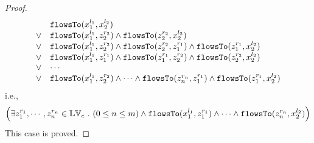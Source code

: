 \begin{proof}
\[\begin{array}{ll}
      & \mathtt{flowsTo}(x_1^{l_1}, x_2^{l_2}) \\
  \lor  & \mathtt{flowsTo}(x_1^{l_1}, z_2^{r_2}) \land \mathtt{flowsTo}(z_2^{r_2}, x_2^{l_2})\\
  \lor  & \mathtt{flowsTo}(x_1^{l_1}, z_2^{r_2}) \land \mathtt{flowsTo}(z_2^{r_2}, z_1^{r_1}) \land \mathtt{flowsTo}(z_1^{r_1}, x_2^{l_2}) \\
  \lor  & \mathtt{flowsTo}(x_1^{l_1}, z_1^{r_1}) \land \mathtt{flowsTo}(z_1^{r_1}, z_2^{r_2}) \land \mathtt{flowsTo}(z_2^{r_2}, x_2^{l_2}) \\
  \lor  & \cdots \\
  \lor  & \mathtt{flowsTo}(x_1^{l_1}, z_2^{r_2}) \land \cdots \land \mathtt{flowsTo}(z_n^{r_n}, z_1^{r_1}) \land \mathtt{flowsTo}(z_1^{r_1}, x_2^{l_2}) \\
\end{array}
\]
i.e.,
\[
\Big(\exists z_1^{r_1}, \cdots, z_n^{r_n} \in \mathbb{LV}_{{c}} ~.~ (0 \leq n \leq m )
 \land \mathtt{flowsTo}(x_1^{l_1}, z_1^{r_1}) \land \cdots \land \mathtt{flowsTo}(z_n^{r_n}, {x}_2^{l_2}) \Big)
\]
This case is proved.


\end{proof}
